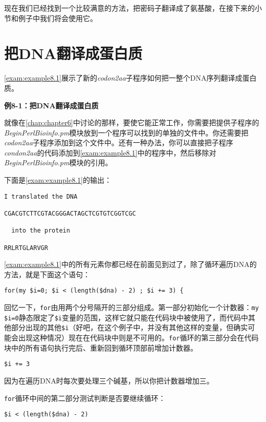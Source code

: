 现在我们已经找到一个比较满意的方法，把密码子翻译成了氨基酸，在接下来的小节和例子中我们将会使用它。

\section{把DNA翻译成蛋白质}
\autoref{exam:example8.1}展示了新的\textit{codon2aa}子程序如何把一整个DNA序列翻译成蛋白质。

\textbf{例8-1：把DNA翻译成蛋白质}


就像在\autoref{chap:chapter6}中讨论的那样，要使它能正常工作，你需要把提供子程序的\textit{BeginPerlBioinfo.pm}模块放到一个程序可以找到的单独的文件中。你还需要把\textit{codon2aa}子程序添加到这个文件中。还有一种办法，你可以直接把子程序\textit{condon2aa}的代码添加到\autoref{exam:example8.1}中的程序中，然后移除对\textit{BeginPerlBioinfo.pm}模块的引用。

下面是\autoref{exam:example8.1}的输出：

\begin{lstlisting}
I translated the DNA

CGACGTCTTCGTACGGGACTAGCTCGTGTCGGTCGC

  into the protein

RRLRTGLARVGR
\end{lstlisting}

\autoref{exam:example8.1}中的所有元素你都已经在前面见到过了，除了循环遍历DNA的方法，就是下面这个语句：

\begin{lstlisting}
for(my $i=0; $i < (length($dna) - 2) ; $i += 3) {
\end{lstlisting}

回忆一下，\verb|for|由用两个分号隔开的三部分组成。第一部分初始化一个计数器：\verb|my $i=0|静态限定了\verb|$i|变量的范围，这样它就只能在代码块中被使用了，而代码中其他部分出现的其他\verb|$i|（好吧，在这个例子中，并没有其他这样的变量，但确实可能会出现这种情况）现在在代码块中则是不可用的。\verb|for|循环的第三部分会在代码块中的所有语句执行完后、重新回到循环顶部前增加计数器。

\begin{lstlisting}
$i += 3
\end{lstlisting}

因为在遍历DNA时每次要处理三个碱基，所以你把计数器增加三。

\verb|for|循环中间的第二部分测试判断是否要继续循环：

\begin{lstlisting}
$i < (length($dna) - 2)
\end{lstlisting}

